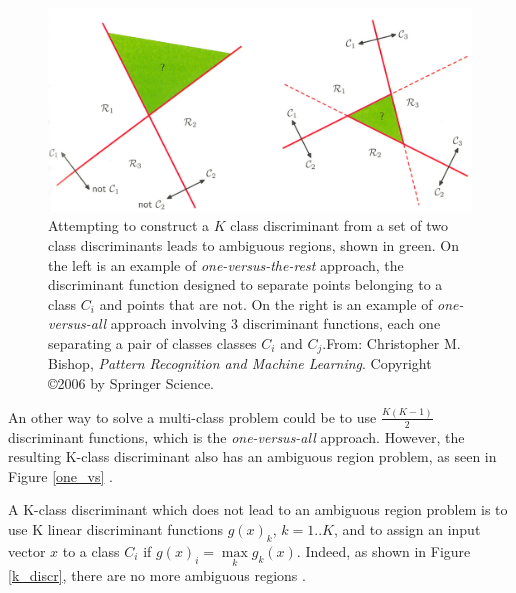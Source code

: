 \begin{figure}[!h]
\begin{center}
\noindent \includegraphics[scale=0.2]{figures/one_vs} 
\newline
\caption{Attempting to construct a $K$ class discriminant from a set of two class discriminants leads to ambiguous regions, shown in green. On the left is an example of \textit{one-versus-the-rest} approach, the discriminant function designed to separate points belonging to a class $C_i$ and points that are not. On the right is an example of \textit{one-versus-all} approach involving 3 discriminant functions, each one separating a pair of classes classes $C_i$ and $C_j$.From: Christopher M. Bishop, \textit{Pattern Recognition and Machine Learning}. Copyright \copyright  2006 by Springer Science.}
\label{one_vs_rest}
\end{center} 
\end{figure}

\noindent An other way to solve a multi-class problem could be to use $\frac{K(K-1)}{2}$ discriminant functions, which is the \textit{one-versus-all} approach. However, the resulting K-class discriminant also has an ambiguous region problem, as seen in Figure \ref{one_vs} \cite{BIS06}.
\newline

\noindent A K-class discriminant which does not lead to an ambiguous region problem is to use K linear discriminant functions $g(x)_k$, $k=1..K$, and to assign an input vector $x$ to a class $C_i$ if $g(x)_i = \max\limits_{k} g_k(x)$. Indeed, as shown in Figure \ref{k_discr}, there are no more ambiguous regions \cite{BIS06}.
\newline

